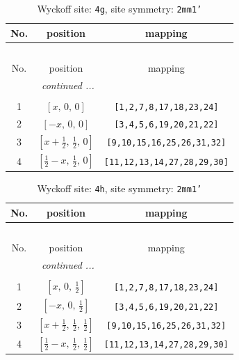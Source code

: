 \documentclass[fleqn,8pt]{jsarticle}
\begin{document}
\renewcommand{\arraystretch}{1.2}
\begin{longtable}{ccc}
\caption{Wyckoff site: {\tt 4g}, site symmetry: {\tt 2mm1'}}
 \\
 \hline \hline
No. & position & mapping \\ \hline \endfirsthead

\multicolumn{2}{l}{\tablename\ \thetable{}} \\
 \hline \hline
No. & position & mapping \\ \hline \endhead

 \hline \hline
\multicolumn{2}{r}{\footnotesize\it continued ...} \\ \endfoot

 \hline \hline
\multicolumn{2}{r}{} \\ \endlastfoot

1 & $\left[ x,\, 0,\, 0 \right]$ & {\tt [1,2,7,8,17,18,23,24]} \\ \hline
2 & $\left[ - x,\, 0,\, 0 \right]$ & {\tt [3,4,5,6,19,20,21,22]} \\ \hline
3 & $\left[ x + \frac{1}{2},\, \frac{1}{2},\, 0 \right]$ & {\tt [9,10,15,16,25,26,31,32]} \\ \hline
4 & $\left[ \frac{1}{2} - x,\, \frac{1}{2},\, 0 \right]$ & {\tt [11,12,13,14,27,28,29,30]} \\
\end{longtable}
\renewcommand{\arraystretch}{1.2}
\begin{longtable}{ccc}
\caption{Wyckoff site: {\tt 4h}, site symmetry: {\tt 2mm1'}}
 \\
 \hline \hline
No. & position & mapping \\ \hline \endfirsthead

\multicolumn{2}{l}{\tablename\ \thetable{}} \\
 \hline \hline
No. & position & mapping \\ \hline \endhead

 \hline \hline
\multicolumn{2}{r}{\footnotesize\it continued ...} \\ \endfoot

 \hline \hline
\multicolumn{2}{r}{} \\ \endlastfoot

1 & $\left[ x,\, 0,\, \frac{1}{2} \right]$ & {\tt [1,2,7,8,17,18,23,24]} \\ \hline
2 & $\left[ - x,\, 0,\, \frac{1}{2} \right]$ & {\tt [3,4,5,6,19,20,21,22]} \\ \hline
3 & $\left[ x + \frac{1}{2},\, \frac{1}{2},\, \frac{1}{2} \right]$ & {\tt [9,10,15,16,25,26,31,32]} \\ \hline
4 & $\left[ \frac{1}{2} - x,\, \frac{1}{2},\, \frac{1}{2} \right]$ & {\tt [11,12,13,14,27,28,29,30]} \\
\end{longtable}
\end{document}
